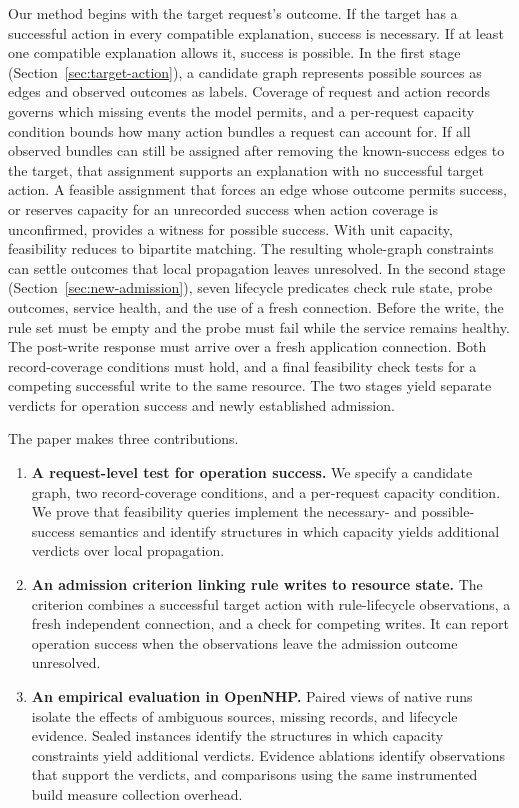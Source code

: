 Our method begins with the target request's outcome. If the target has a successful action in every compatible explanation, success is necessary. If at least one compatible explanation allows it, success is possible. In the first stage (Section~\ref{sec:target-action}), a candidate graph represents possible sources as edges and observed outcomes as labels. Coverage of request and action records governs which missing events the model permits, and a per-request capacity condition bounds how many action bundles a request can account for. If all observed bundles can still be assigned after removing the known-success edges to the target, that assignment supports an explanation with no successful target action. A feasible assignment that forces an edge whose outcome permits success, or reserves capacity for an unrecorded success when action coverage is unconfirmed, provides a witness for possible success. With unit capacity, feasibility reduces to bipartite matching. The resulting whole-graph constraints can settle outcomes that local propagation leaves unresolved. In the second stage (Section~\ref{sec:new-admission}), seven lifecycle predicates check rule state, probe outcomes, service health, and the use of a fresh connection. Before the write, the rule set must be empty and the probe must fail while the service remains healthy. The post-write response must arrive over a fresh application connection. Both record-coverage conditions must hold, and a final feasibility check tests for a competing successful write to the same resource. The two stages yield separate verdicts for operation success and newly established admission.

The paper makes three contributions.

\begin{enumerate}
\def\labelenumi{\arabic{enumi}.}
\tightlist
\item
  \textbf{A request-level test for operation success.} We specify a candidate graph, two record-coverage conditions, and a per-request capacity condition. We prove that feasibility queries implement the necessary- and possible-success semantics and identify structures in which capacity yields additional verdicts over local propagation.
\item
  \textbf{An admission criterion linking rule writes to resource state.} The criterion combines a successful target action with rule-lifecycle observations, a fresh independent connection, and a check for competing writes. It can report operation success when the observations leave the admission outcome unresolved.
\item
  \textbf{An empirical evaluation in OpenNHP.} Paired views of native runs isolate the effects of ambiguous sources, missing records, and lifecycle evidence. Sealed instances identify the structures in which capacity constraints yield additional verdicts. Evidence ablations identify observations that support the verdicts, and comparisons using the same instrumented build measure collection overhead.
\end{enumerate}

